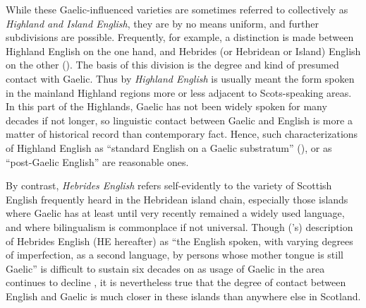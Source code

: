 \documentclass[output=paper,colorlinks,citecolor=brown]{langscibook}
\begin{document}
While these Gaelic-influenced varieties are sometimes referred to collectively as \textit{Highland and Island English}, they are by no means uniform, and further subdivisions are possible. Frequently, for example, a distinction is made between Highland English on the one hand, and Hebrides (or Hebridean or Island) English on the other (\cite{Clement:1980, Clement:1997, Shuken:1985, Sabban:1985, Bird:1997}). The basis of this division is the degree and kind of presumed contact with Gaelic. Thus by \textit{Highland English} is usually meant the form spoken in the mainland Highland regions more or less adjacent to Scots-speaking areas. In this part of the Highlands, Gaelic has not been widely spoken for many decades if not longer, so linguistic contact between Gaelic and English is more a matter of historical record than contemporary fact. Hence, such characterizations of Highland English as “standard English on a Gaelic substratum” (\citealt{Mather:1986}), or as “post\hyp Gaelic English” \citep{Catford:1957b}  are reasonable ones. 


By contrast, \textit{Hebrides English} refers self-evidently to the variety of Scottish English frequently heard in the Hebridean island chain, especially those islands where Gaelic has at least until very recently remained a widely used language, and where bilingualism is commonplace if not universal. Though (\cite{Catford:1957b}'s) description of Hebrides English (HE hereafter) as “the English spoken, with varying degrees of imperfection, as a second language, by persons whose mother tongue is still Gaelic” is difficult to sustain six decades on as usage of Gaelic in the area continues to decline \citep{gw:ÓGiollagáin2020}, it is nevertheless true that the degree of contact between English and Gaelic is much closer in these islands than anywhere else in Scotland. 
\end{document}
